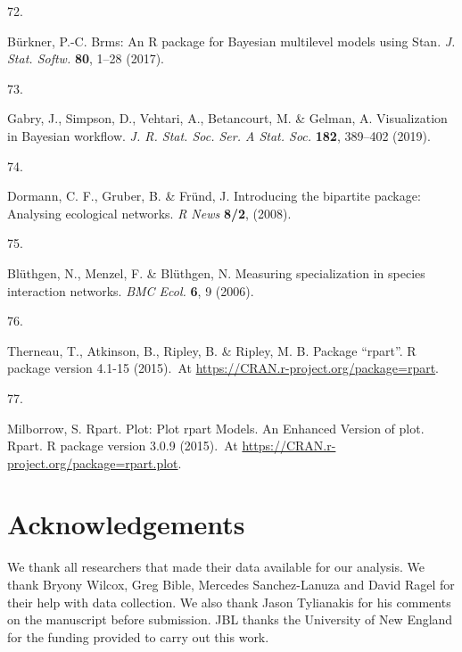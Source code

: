 \documentclass[
  12pt,
  a4paper,
]{article}
\newlength{\cslhangindent}
\newlength{\csllabelwidth}
\newlength{\cslentryspacingunit} %
\newenvironment{CSLReferences}[2] %
 {%
  \setlength{\parindent}{0pt}
  \ifodd #1
  \let\oldpar\par
  \def\par{\hangindent=\cslhangindent\oldpar}
  \fi
  \setlength{\parskip}{#2\cslentryspacingunit}
 }%
 {}
\newcommand{\CSLLeftMargin}[1]{\parbox[t]{\csllabelwidth}{#1}}
\newcommand{\CSLRightInline}[1]{\parbox[t]{\linewidth - \csllabelwidth}{#1}\break}
\begin{document}
\begin{CSLReferences}{0}{0}
\leavevmode{}%
\CSLLeftMargin{72. }
\CSLRightInline{Bürkner, P.-C. Brms: {An R} package for {Bayesian} multilevel models using {Stan}. \emph{J. Stat. Softw.} \textbf{80}, 1--28 (2017).}

\leavevmode{}%
\CSLLeftMargin{73. }
\CSLRightInline{Gabry, J., Simpson, D., Vehtari, A., Betancourt, M. \& Gelman, A. Visualization in {Bayesian} workflow. \emph{J. R. Stat. Soc. Ser. A Stat. Soc.} \textbf{182}, 389--402 (2019).}

\leavevmode{}%
\CSLLeftMargin{74. }
\CSLRightInline{Dormann, C. F., Gruber, B. \& Fründ, J. Introducing the bipartite package: Analysing ecological networks. \emph{R News} \textbf{8/2}, (2008).}

\leavevmode{}%
\CSLLeftMargin{75. }
\CSLRightInline{Blüthgen, N., Menzel, F. \& Blüthgen, N. Measuring specialization in species interaction networks. \emph{BMC Ecol.} \textbf{6}, 9 (2006).}

\leavevmode{}%
\CSLLeftMargin{76. }
\CSLRightInline{Therneau, T., Atkinson, B., Ripley, B. \& Ripley, M. B. Package {``rpart''}. R package version 4.1-15 (2015).~At \href{https://CRAN.R-project.org/package=rpart}{https://CRAN.r-project.org/package=rpart}.}

\leavevmode{}%
\CSLLeftMargin{77. }
\CSLRightInline{Milborrow, S. Rpart. Plot: {Plot} rpart {Models}. {An Enhanced Version} of plot. Rpart. R package version 3.0.9 (2015).~At \href{https://CRAN.R-project.org/package=rpart.plot}{https://CRAN.r-project.org/package=rpart.plot}.}

\end{CSLReferences}

\hypertarget{acknowledgements}{%
\section{Acknowledgements}\label{acknowledgements}}

We thank all researchers that made their data available for our analysis. We thank Bryony Wilcox, Greg Bible, Mercedes Sanchez-Lanuza and David Ragel for their help with data collection. We also thank Jason Tylianakis for his comments on the manuscript before submission. JBL thanks the University of New England for the funding provided to carry out this work.
\end{document}
